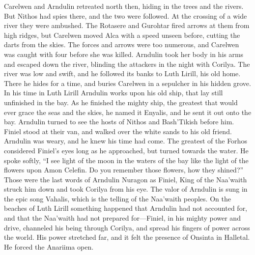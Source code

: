 \documentclass[smalldemyvopaper,11pt,twoside,onecolumn,openright,extrafontsizes]{memoir}
\begin{document}
	Carelwen and Arndulin retreated north then, hiding in the trees and the rivers. But Nithos had spies there, and the two were followed. At the crossing of a wide river they were ambushed. The Rotasere and Gurohtar fired arrows at them from high ridges, but Carelwen moved Alca with a speed unseen before, cutting the darts from the skies. The forces and arrows were too numerous, and Carelwen was caught with four before she was killed. Arndulin took her body in his arms and escaped down the river, blinding the attackers in the night with Corilya. The river was low and swift, and he followed its banks to Luth Lirill, his old home. There he hides for a time, and buries Carelwen in a sepulcher in his hidden grove. In his time in Luth Lirill Arndulin works upon his old ship, that lay still unfinished in the bay. As he finished the mighty ship, the greatest that would ever grace the seas and the skies, he named it Enyalis, and he sent it out onto the bay. Arndulin turned to see the hosts of Nithos and Bash’Tikish before him. Finiel stood at their van, and walked over the white sands to his old friend. Arndulin was weary, and he knew his time had come. The greatest of the Forhos considered Finiel’s eyes long as he approached, but turned towards the water. He spoke softly, “I see light of the moon in the waters of the bay like the light of the flowers upon Amon Celefin. Do you remember those flowers, how they shined?” Those were the last words of Arndulin Nuragon as Finiel, King of the Naa’waith struck him down and took Corilya from his eye. The valor of Arndulin is sung in the epic song Vahalis, which is the telling of the Naa’waith peoples.
	On the beaches of Luth Lirill something happened that Arndulin had not accounted for, and that the Naa’waith had not prepared for—Finiel, in his mighty power and drive, channeled his being through Corilya, and spread his fingers of power across the world. His power stretched far, and it felt the presence of Onsinta in Halletal. He forced the Anariima open.
	
\end{document}
